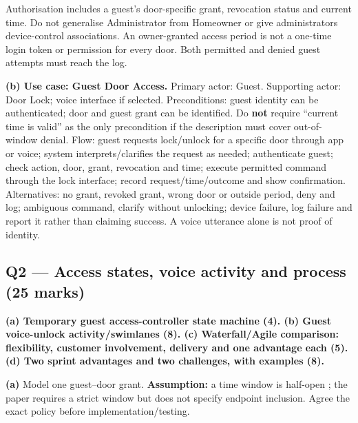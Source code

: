 \begin{studycolumns}
\vspace{0pt}




Authorisation includes a guest's door-specific grant, revocation status and current time. Do not generalise Administrator from Homeowner or give administrators device-control associations. An owner-granted access period is not a one-time login token or permission for every door. Both permitted and denied guest attempts must reach the log.

\textbf{(b) Use case: Guest Door Access.} Primary actor: Guest. Supporting actor: Door Lock; voice interface if selected. Preconditions: guest identity can be authenticated; door and guest grant can be identified. Do \textbf{not} require ``current time is valid'' as the only precondition if the description must cover out-of-window denial. Flow: guest requests lock/\allowbreak{}unlock for a specific door through app or voice; system interprets/\allowbreak{}clarifies the request as needed; authenticate guest; check action, door, grant, revocation and time; execute permitted command through the lock interface; record request/\allowbreak{}time/\allowbreak{}outcome and show confirmation. Alternatives: no grant, revoked grant, wrong door or outside period, deny and log; ambiguous command, clarify without unlocking; device failure, log failure and report it rather than claiming success. A voice utterance alone is not proof of identity.

\subsection*{Q2 --- Access states, voice activity and process (25 marks)}
\textbf{(a) Temporary guest access-controller state machine (4). (b) Guest voice-unlock activity/\allowbreak{}swimlanes (8). (c) Waterfall/\allowbreak{}Agile comparison: flexibility, customer involvement, delivery and one advantage each (5). (d) Two sprint advantages and two challenges, with examples (8).}


\textbf{(a)} Model one guest--door grant. \textbf{Assumption:} a time window is half-open \code{[start,\allowbreak{}end)}; the paper requires a strict window but does not specify endpoint inclusion. Agree the exact policy before implementation/\allowbreak{}testing.
\end{studycolumns}



